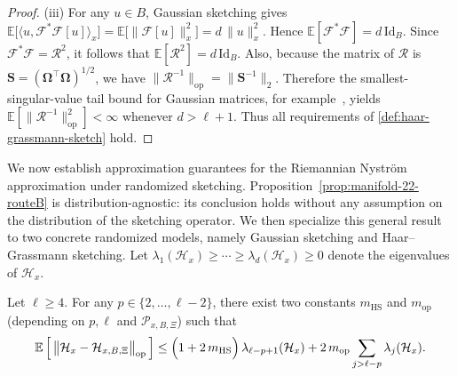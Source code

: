 \documentclass[final,onefignum,onetabnum]{siamart250211}
\begin{document}
\begin{proof}
\noindent(iii) For any $u\in B$, Gaussian sketching gives
$
\mathbb E\big[\langle u,\mathcal F^{*}\mathcal F[u]\rangle_x\big]
=
\mathbb E\big[\|\mathcal F[u]\|_x^2\big]
=d\,\|u\|_x^2.
$
Hence
$
\mathbb E[\mathcal F^{*}\mathcal F]=d\,\mathrm{Id}_B.
$
Since $\mathcal F^{*}\mathcal F=\mathcal R^2$, it follows that
$
\mathbb E[\mathcal R^2]=d\,\mathrm{Id}_B.
$
Also, because the matrix of $\mathcal R$ is $\mathbf S=(\mathbf\Omega^{\top}\mathbf\Omega)^{1/2}$, we have
$
\|\mathcal R^{-1}\|_{\mathrm{op}}=
\|\mathbf S^{-1}\|_2
$.
Therefore the smallest-singular-value tail bound for Gaussian matrices, for example~\cite[Theorem~4.6.1]{Vershynin2018HDP}, yields
$
\mathbb E [ \|\mathcal R^{-1}\|_{\mathrm{op}}^2 ]<\infty
$
whenever $d>\ell+1$.
Thus all requirements of \cref{def:haar-grassmann-sketch} hold.
\end{proof}



We now establish approximation guarantees for the Riemannian Nystr\"om approximation under randomized sketching. Proposition~\ref{prop:manifold-22-routeB} is distribution-agnostic: its conclusion holds without any assumption on the distribution of the sketching operator. We then specialize this general result to two concrete randomized models, namely Gaussian sketching and Haar--Grassmann sketching. Let \(\lambda_1(\mathcal{H}_x)\ge\cdots\ge\lambda_d(\mathcal{H}_x)\ge 0\) denote the eigenvalues of \(\mathcal{H}_x\).

\begin{proposition}
  \label{prop:manifold-22-routeB}
  Let $\ell\ge 4$.
  For any $p\in\{2,\dots,\ell-2\}$,
  there exist two constants $m_{\mathrm{HS}}$ and $m_{\mathrm{op}}$ (depending on $p, \ell$ and $\mathcal{P}_{x, B, \Xi}$) such that
  \[
  \mathbb E\left[\,\big\|\mathcal{H}_x-\mathcal{H}_{x,B,\Xi}\big\|_{\mathrm{op}}\,\right]
  \le
  \Bigl(1+2\,m_{\mathrm{HS}}\Bigr)\,\lambda_{\ell-p+1}(\mathcal{H}_x)
  +2\,m_{\mathrm{op}}\sum_{j>\ell-p}\lambda_j(\mathcal{H}_x).
  \]

\end{proposition}
\end{document}
